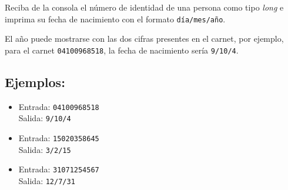 Reciba de la consola el número de identidad de una persona como tipo \textit{long} e imprima su fecha de nacimiento con el formato  \texttt{día/mes/año}.

El año puede mostrarse con las dos cifras presentes en el carnet, por ejemplo, para el carnet \texttt{04100968518}, la fecha de nacimiento sería \texttt{9/10/4}.

\subsection*{Ejemplos:}
\begin{itemize}
    \item Entrada: \texttt{04100968518}\\
          Salida: \texttt{9/10/4}
    \item Entrada: \texttt{15020358645}\\
          Salida: \texttt{3/2/15}
    \item Entrada: \texttt{31071254567}\\
          Salida: \texttt{12/7/31}
\end{itemize}